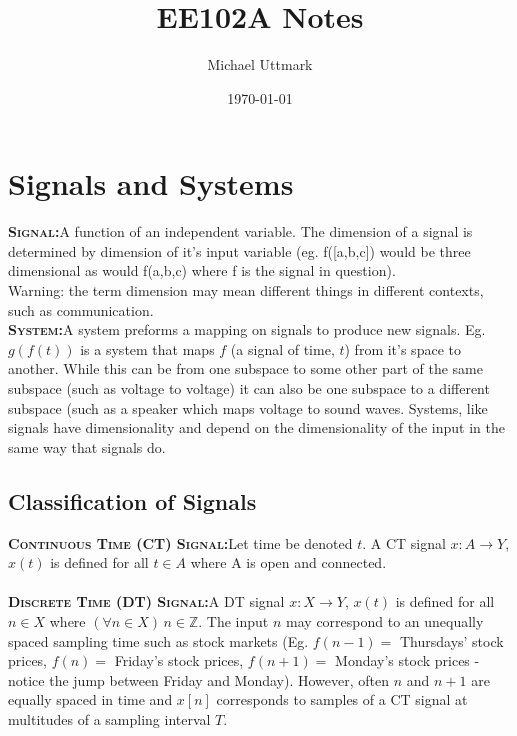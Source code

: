 \documentclass[a4paper,12pt]{article}
\newcommand{\define}[2]{\label{#1}\textbf{\textsc{#1:}}\quad#2\\}
\begin{document}
\title{EE102A Notes}
\author{Michael Uttmark}
\date{\today{}}
\maketitle
\section{Signals and Systems}
\define{Signal}{A function of an independent variable. The dimension of a signal is determined by dimension of it's input variable (eg. f([a,b,c]) would be three dimensional as would f(a,b,c) where f is the signal in question).}
Warning: the term dimension may mean different things in different contexts, such as communication.\\

\define{System}{A system preforms a mapping on signals to produce new signals. Eg. $g(f(t))$ is a system that maps $f$ (a signal of time, $t$) from it's space to another. While this can be from one subspace to some other part of the same subspace (such as voltage to voltage) it can also be one subspace to a different subspace (such as a speaker which maps voltage to sound waves. Systems, like signals have dimensionality and depend on the dimensionality of the input in the same way that signals do.}

\subsection{Classification of Signals}

\define{Continuous Time (CT) Signal}{Let time be denoted $t$. A CT signal $x:A\rightarrow Y$,\, $x(t)$ is defined for all $t\in A$ where A is open and connected.}\\
\define{Discrete Time (DT) Signal}{A DT signal $x:X\rightarrow Y$, $x(t)$ is defined for all $n\in X$ where $(\forall n\in X)\, n\in \mathbb{Z}$. The input $n$ may correspond to an unequally spaced sampling time such as stock markets (Eg. $f(n-1)=$ Thursdays' stock prices, $f(n)=$ Friday's stock prices, $f(n+1)=$ Monday's stock prices - notice the jump between Friday and Monday). However, often $n$ and $n+1$ are equally spaced in time and $x[n]$ corresponds to samples of a CT signal at multitudes of a sampling interval $T$.}
\end{document}
